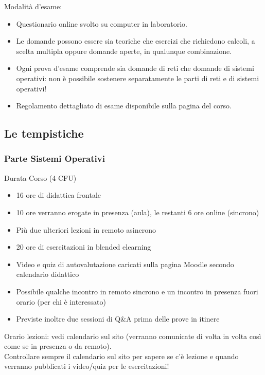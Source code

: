 Modalità d'esame:
\begin{itemize}
    \item Questionario online svolto su computer in laboratorio.
    \item Le domande possono essere sia teoriche che esercizi che richiedono calcoli, a scelta multipla oppure domande aperte, in qualunque combinazione.
    \item Ogni prova d'esame comprende sia domande di reti che domande di sistemi operativi: non è possibile sostenere separatamente le parti di reti e di sistemi operativi!
    \item Regolamento dettagliato di esame disponibile sulla pagina del corso.
\end{itemize}

\subsection{Le tempistiche}
\subsubsection{Parte Sistemi Operativi}
Durata Corso (4 CFU)
\begin{itemize}
    \item 16 ore di didattica frontale
    \item 10 ore verranno erogate in presenza (aula), le restanti 6 ore online (sincrono)
    \item Più due ulteriori lezioni in remoto asincrono
    \item 20 ore di esercitazioni in blended elearning
    \item Video e quiz di autovalutazione caricati sulla pagina Moodle secondo calendario didattico
    \item Possibile qualche incontro in remoto sincrono e un incontro in presenza fuori orario (per chi è interessato)
    \item Previste inoltre due sessioni di Q&A prima delle prove in itinere
\end{itemize}
Orario lezioni: vedi calendario sul sito (verranno comunicate di volta in volta così come se in presenza o da remoto).\\
Controllare sempre il calendario sul sito per sapere se c'è lezione e quando verranno pubblicati i video/quiz per le esercitazioni!

